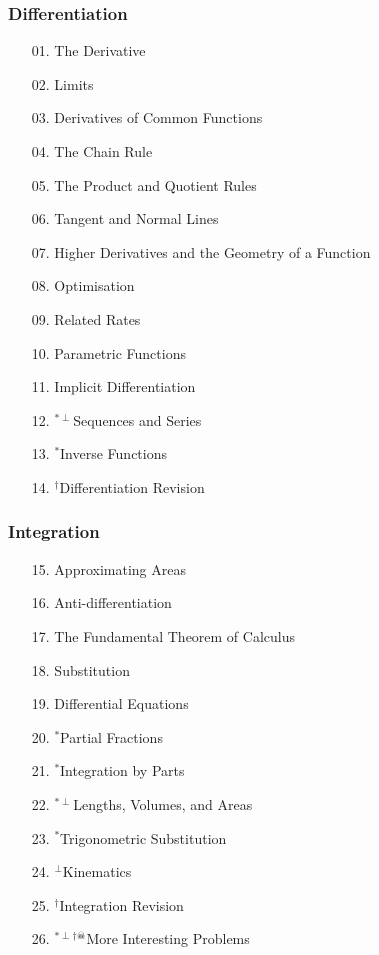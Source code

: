 \subsubsection*{Differentiation}
\begin{enumerate}
  \item[01.] The Derivative
  \item[02.] Limits
  \item[03.] Derivatives of Common Functions
  \item[04.] The Chain Rule
  \item[05.] The Product and Quotient Rules
  \item[06.] Tangent and Normal Lines
  \item[07.] Higher Derivatives and the Geometry of a Function
  \item[08.] Optimisation
  \item[09.] Related Rates
  \item[10.] Parametric Functions
  \item[11.] Implicit Differentiation
  \item[12.] $^{*\perp}$Sequences and Series
  \item[13.] $^*$Inverse Functions
  \item[14.] $^\dagger$Differentiation Revision
\end{enumerate}

\subsubsection*{Integration}
\begin{enumerate}
  \item[15.] Approximating Areas
  \item[16.] Anti-differentiation
  \item[17.] The Fundamental Theorem of Calculus
  \item[18.] Substitution
  \item[19.] Differential Equations
  \item[20.] $^*$Partial Fractions
  \item[21.] $^*$Integration by Parts
  \item[22.] $^{*\perp}$Lengths, Volumes, and Areas
  \item[23.] $^*$Trigonometric Substitution
  \item[24.] $^\perp$Kinematics
  \item[25.] $^\dagger$Integration Revision
  \item[26.] $^{*\perp\dagger\skull}$More Interesting Problems
\end{enumerate}

